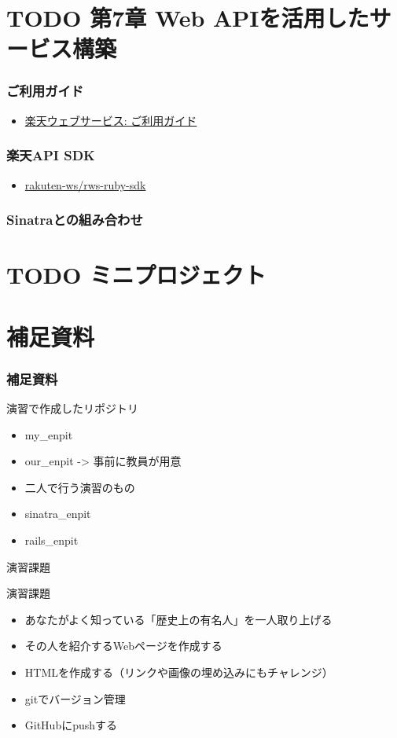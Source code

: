 \documentclass[t, aspectratio=169]{beamer}
\begin{document}
\part{{\bfseries\sffamily TODO} 第7章 Web APIを活用したサービス構築}
\label{sec-8}
\section{ご利用ガイド}
\label{sec-8-1}
\begin{itemize}
\item \href{https://webservice.rakuten.co.jp/guide/}{楽天ウェブサービス: ご利用ガイド}
\end{itemize}
\section{楽天API SDK}
\label{sec-8-2}
\begin{itemize}
\item \href{https://github.com/rakuten-ws/rws-ruby-sdk}{rakuten-ws/rws-ruby-sdk}
\end{itemize}
\section{Sinatraとの組み合わせ}
\label{sec-8-3}

\part{{\bfseries\sffamily TODO} ミニプロジェクト}
\label{sec-9}
\part{補足資料}
\label{sec-10}
\section{補足資料}
\label{sec-10-1}
\begin{frame}[label=sec-10-1-1]{演習で作成したリポジトリ}
\begin{itemize}
\item my\_enpit
\item our\_enpit -> 事前に教員が用意
\item 二人で行う演習のもの
\item sinatra\_enpit
\item rails\_enpit
\end{itemize}
\end{frame}
\begin{frame}[label=sec-10-1-2]{演習課題}
\begin{block}{演習課題}
\begin{itemize}
\item あなたがよく知っている「歴史上の有名人」を一人取り上げる
\item その人を紹介するWebページを作成する
\item HTMLを作成する（リンクや画像の埋め込みにもチャレンジ）
\item gitでバージョン管理
\item GitHubにpushする
\end{itemize}
\end{block}
\end{frame}
\end{document}

